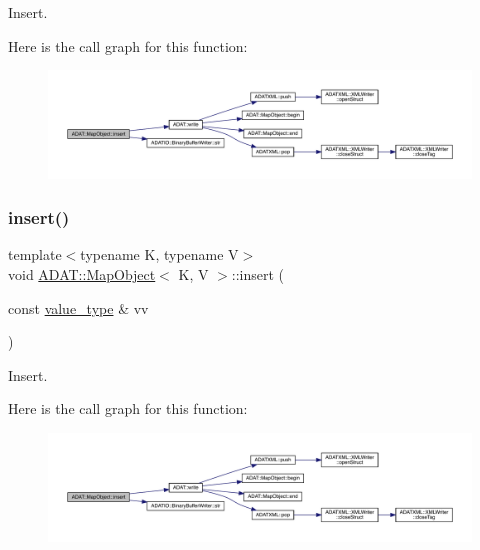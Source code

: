 Insert. 

Here is the call graph for this function\+:
\nopagebreak
\begin{figure}[H]
\begin{center}
\leavevmode
\includegraphics[width=350pt]{da/d29/classADAT_1_1MapObject_aaa819ee6219acf8f74c39563c9c68ab4_cgraph}
\end{center}
\end{figure}
\mbox{\label{classADAT_1_1MapObject_aaa819ee6219acf8f74c39563c9c68ab4}} 
\subsubsection{\texorpdfstring{insert()}{insert()}\hspace{0.1cm}{\footnotesize\ttfamily [6/6]}}
{\footnotesize\ttfamily template$<$typename K, typename V$>$ \\
void \mbox{\hyperlink{classADAT_1_1MapObject}{A\+D\+A\+T\+::\+Map\+Object}}$<$ K, V $>$\+::insert (\begin{DoxyParamCaption}\item[{const \mbox{\hyperlink{classADAT_1_1MapObject_ad985e6ff5b35a72c79d4b466d316cc0a}{value\+\_\+type}} \&}]{vv }\end{DoxyParamCaption})\hspace{0.3cm}{\ttfamily [inline]}}



Insert. 

Here is the call graph for this function\+:
\nopagebreak
\begin{figure}[H]
\begin{center}
\leavevmode
\includegraphics[width=350pt]{da/d29/classADAT_1_1MapObject_aaa819ee6219acf8f74c39563c9c68ab4_cgraph}
\end{center}
\end{figure}
\mbox{\label{classADAT_1_1MapObject_af767d0e9da82e3a249d3340d57da66e1}} 
